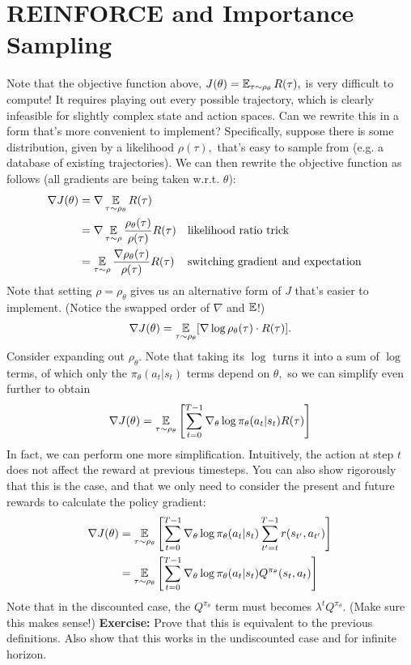 \documentclass[\main/main]{subfiles}
\begin{document}
\section{REINFORCE and Importance Sampling}

Note that the objective function above, $J(\theta) = \operatorname*{\mathbb{E}}_{\tau \sim \rho_\theta}R(\tau),$ is very difficult to compute! It requires playing out every possible trajectory,
which is clearly infeasible for slightly complex state and action spaces.
Can we rewrite this in a form that's more convenient to implement?
Specifically, suppose there is some distribution, given by a likelihood $\rho(\tau),$ that's easy to sample from (e.g. a database of existing trajectories).
We can then rewrite the objective function as follows (all gradients are being taken w.r.t. $\theta$):
\begin{align*}
    \nabla J(\theta) &= \nabla \operatorname*{\mathbb{E}}_{\tau \sim \rho_\theta} R(\tau) \\
    &= \nabla \operatorname*{\mathbb{E}}_{\tau \sim \rho} \frac{\rho_\theta(\tau)}{\rho(\tau)} R(\tau) && \text{likelihood ratio trick} \\
    &= \operatorname*{\mathbb{E}}_{\tau \sim \rho} \frac{\nabla \rho_\theta(\tau)}{\rho(\tau)} R(\tau) && \text{switching gradient and expectation}
\end{align*}
Note that setting $\rho = \rho_\theta$ gives us an alternative form of $J$ that's easier to implement. (Notice the swapped order of $\nabla$ and $\operatorname*{\mathbb{E}}$!)
\begin{align*}
    \nabla J(\theta) = \operatorname*{\mathbb{E}}_{\tau \sim \rho_\theta} [ \nabla \log \rho_\theta(\tau) \cdot R(\tau)].
\end{align*}
Consider expanding out $\rho_\theta.$ Note that taking its $\log$ turns it into a sum of $\log$ terms, of which only the $\pi_\theta(a_t | s_t)$ terms depend on $\theta,$ so we can simplify even further to obtain
\begin{align*}
    \nabla J(\theta) = \operatorname*{\mathbb{E}}_{\tau \sim \rho_\theta} \left[ \sum_{t=0}^{T-1} \nabla_\theta \log \pi_{\theta}(a_t | s_t) R(\tau) \right]
\end{align*}
In fact, we can perform one more simplification. Intuitively, the action at step $t$ does not affect the reward at previous timesteps. You can also show rigorously that this is the case, and that we only need to consider the present and future rewards to calculate the policy gradient: \begin{equation}
    \begin{split}
    \nabla J(\theta) &= \operatorname*{\mathbb{E}}_{\tau \sim \rho_\theta} \left[ \sum_{t=0}^{T-1} \nabla_\theta \log \pi_{\theta}(a_t | s_t) \sum_{t' = t}^{T-1} r(s_{t'}, a_{t'}) \right] \\
    &= \operatorname*{\mathbb{E}}_{\tau \sim \rho_\theta} \left[ \sum_{t=0}^{T-1} \nabla_\theta \log \pi_{\theta}(a_t | s_t) Q^{\pi_\theta}(s_{t}, a_{t}) \right]
    \end{split}
    \label{eq:pg_with_q}
\end{equation}
Note that in the discounted case, the $Q^{\pi_\theta}$ term must becomes $\lambda^t Q^{\pi_\theta}.$ (Make sure this makes sense!)
\textbf{Exercise:} Prove that this is equivalent to the previous definitions. Also show that this works in the undiscounted case and for infinite horizon.
\end{document}
